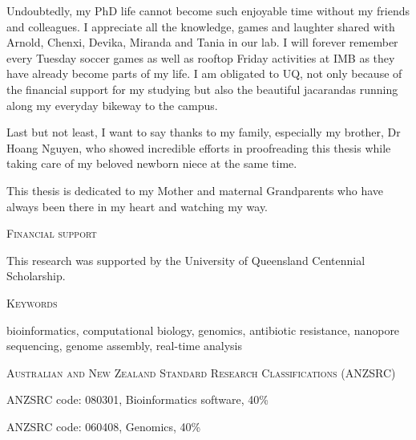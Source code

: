 \vspace{.3cm}

Undoubtedly, my PhD life cannot become such enjoyable time without my friends and colleagues. I appreciate all the knowledge, games and laughter shared with Arnold, Chenxi, Devika, Miranda and Tania in our lab. I will forever remember every Tuesday soccer games as well as rooftop Friday activities at IMB as they have already become parts of my life. I am obligated to UQ, not only because of the financial support for my studying but also the beautiful jacarandas running along my everyday bikeway to the campus. 

\vspace{.3cm}

Last but not least, I want to say thanks to my family, especially my brother, Dr Hoang Nguyen, who showed incredible efforts in proofreading this thesis while taking care of my beloved newborn niece at the same time.

\vspace{.3cm}

This thesis is dedicated to my Mother and maternal Grandparents who have always been there in my heart and watching my way.  

\afterpage{\null\thispagestyle{empty}\newpage}
\newpage


\thispagestyle{plain}

\begin{center}
\Large \textsc{Financial support}
\end{center}

This research was supported by the University of Queensland Centennial Scholarship.

\vspace{2cm}
\begin{center}
\Large \textsc{Keywords}
\end{center}

bioinformatics, computational biology, genomics, antibiotic resistance, nanopore sequencing, genome assembly, real-time analysis

\vspace{2cm}
\begin{center}
\Large \textsc{Australian and New Zealand Standard Research Classifications (ANZSRC)}
\end{center}

ANZSRC code: 080301, Bioinformatics software, 40\%

ANZSRC code: 060408, Genomics, 40\%

